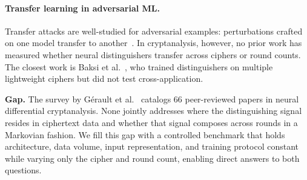 \paragraph{Transfer learning in adversarial ML.}
Transfer attacks are well-studied for adversarial examples: perturbations crafted on one model transfer to another~\citep{gohr2019}.
In cryptanalysis, however, no prior work has measured whether neural distinguishers transfer across ciphers or round counts.
The closest work is Baksi et al.~\citep{baksi2022neural}, who trained distinguishers on multiple lightweight ciphers but did not test cross-application.

\medskip\noindent\textbf{Gap.}
The survey by Gérault et al.~\citep{gerault2024sok} catalogs 66 peer-reviewed papers in neural differential cryptanalysis.
None jointly addresses where the distinguishing signal resides in ciphertext data and whether that signal composes across rounds in a Markovian fashion.
We fill this gap with a controlled benchmark that holds architecture, data volume, input representation, and training protocol constant while varying only the cipher and round count, enabling direct answers to both questions.
